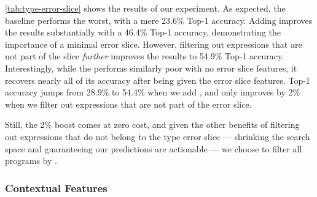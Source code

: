 \autoref{tab:type-error-slice} shows the results of our experiment.
%
As expected, the baseline performs the worst, with a mere 23.6\% \linear
Top-1 accuracy.
%
Adding \InSlice improves the results substantially with a 46.4\% \linear Top-1
accuracy, demonstrating the importance of a minimal error slice.
%
However, filtering out expressions that are not part of the slice
\emph{further} improves the results to 54.9\% \linear Top-1 accuracy.
%
Interestingly, while the \hiddenFH performs similarly poor with no error
slice features, it recovers nearly all of its accuracy after being given
the error slice features.
%
Top-1 accuracy jumps from 28.9\% to 54.4\% when we add \InSlice, and only
improves by 2\% when we filter out expressions that are not part of the
error slice.

Still, the 2\% boost comes at zero cost, and given the other benefits
of filtering out expressions that do not belong to the type error slice
--- shrinking the search space and guaranteeing our predictions are actionable ---
we choose to filter all programs by \InSlice.

\subsubsection{Contextual Features}
\label{sec:contextual-features}

